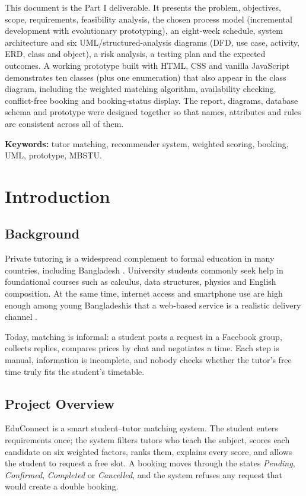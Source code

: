 \documentclass[11pt,a4paper]{article}
\begin{document}
This document is the Part I deliverable. It presents the problem, objectives, scope, requirements, feasibility analysis, the chosen process model (incremental development with evolutionary prototyping), an eight-week schedule, system architecture and six UML/structured-analysis diagrams (DFD, use case, activity, ERD, class and object), a risk analysis, a testing plan and the expected outcomes. A working prototype built with HTML, CSS and vanilla JavaScript demonstrates ten classes (plus one enumeration) that also appear in the class diagram, including the weighted matching algorithm, availability checking, conflict-free booking and booking-status display. The report, diagrams, database schema and prototype were designed together so that names, attributes and rules are consistent across all of them.

\medskip
\textbf{Keywords:} tutor matching, recommender system, weighted scoring, booking, UML, prototype, MBSTU.

\newpage
\tableofcontents
\newpage
\listoffigures
\listoftables
\newpage
{}

\section{Introduction}
\subsection{Background}
Private tutoring is a widespread complement to formal education in many countries, including Bangladesh \cite{bray2009}. University students commonly seek help in foundational courses such as calculus, data structures, physics and English composition. At the same time, internet access and smartphone use are high enough among young Bangladeshis that a web-based service is a realistic delivery channel \cite{datareportal2024}.

Today, matching is informal: a student posts a request in a Facebook group, collects replies, compares prices by chat and negotiates a time. Each step is manual, information is incomplete, and nobody checks whether the tutor's free time truly fits the student's timetable.

\subsection{Project Overview}
EduConnect is a smart student--tutor matching system. The student enters requirements once; the system filters tutors who teach the subject, scores each candidate on six weighted factors, ranks them, explains every score, and allows the student to request a free slot. A booking moves through the states \emph{Pending}, \emph{Confirmed}, \emph{Completed} or \emph{Cancelled}, and the system refuses any request that would create a double booking.
\end{document}
